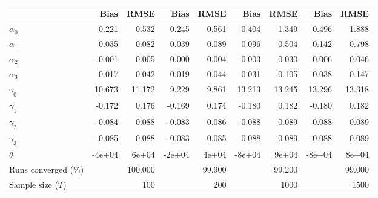 
\begin{tabular}[t]{lrrrrrrrr}
\toprule
  & Bias & RMSE & Bias & RMSE & Bias & RMSE & Bias & RMSE\\
\midrule
$\alpha_{0}$ & 0.221 & 0.532 & 0.245 & 0.561 & 0.404 & 1.349 & 0.496 & 1.888\\
$\alpha_{1}$ & 0.035 & 0.082 & 0.039 & 0.089 & 0.096 & 0.504 & 0.142 & 0.798\\
$\alpha_{2}$ & -0.001 & 0.005 & 0.000 & 0.004 & 0.003 & 0.030 & 0.006 & 0.046\\
$\alpha_{3}$ & 0.017 & 0.042 & 0.019 & 0.044 & 0.031 & 0.105 & 0.038 & 0.147\\
$\gamma_{0}$ & 10.673 & 11.172 & 9.229 & 9.861 & 13.213 & 13.245 & 13.296 & 13.318\\
$\gamma_{1}$ & -0.172 & 0.176 & -0.169 & 0.174 & -0.180 & 0.182 & -0.180 & 0.182\\
$\gamma_{2}$ & -0.084 & 0.088 & -0.083 & 0.086 & -0.088 & 0.089 & -0.088 & 0.089\\
$\gamma_{3}$ & -0.085 & 0.088 & -0.083 & 0.085 & -0.088 & 0.089 & -0.088 & 0.089\\
$\theta$ & -4e+04 & 6e+04 & -2e+04 & 4e+04 & -8e+04 & 9e+04 & -8e+04 & 8e+04\\
Runs converged (\%) &  & 100.000 &  & 99.900 &  & 99.200 &  & 99.000\\
Sample size ($T$) &  & 100 &  & 200 &  & 1000 &  & 1500\\
\bottomrule
\end{tabular}
